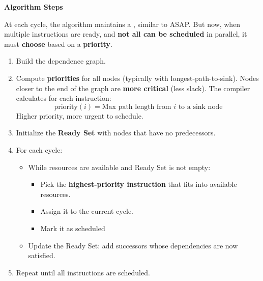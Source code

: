 \highspace
\begin{flushleft}
    \textcolor{Green3}{ \textbf{Algorithm Steps}}
\end{flushleft}
At each cycle, the algorithm maintains a , similar to ASAP. But now, when multiple instructions are ready, and \textbf{not all can be scheduled} in parallel, it must \textbf{choose} based on a \textbf{priority}.
\begin{enumerate}
    \item Build the dependence graph.
    \item Compute \textbf{priorities} for all nodes (typically with longest-path-to-sink). Nodes closer to the end of the graph are \textbf{more critical} (less slack). The compiler calculates for each instruction:
    \begin{equation*}
        \text{priority}\left(i\right) = \text{Max path length from } i \text{ to a sink node}
    \end{equation*}
    Higher priority, more urgent to schedule.
    \item Initialize the \textbf{Ready Set} with nodes that have no predecessors.
    \item For each cycle:
    \begin{itemize}
        \item While resources are available and Ready Set is not empty:
        \begin{itemize}
            \item Pick the \textbf{highest-priority instruction} that fits into available resources.
            \item Assign it to the current cycle.
            \item Mark it as scheduled
        \end{itemize}
        \item Update the Ready Set: add successors whose dependencies are now satisfied.
    \end{itemize}
    \item Repeat until all instructions are scheduled.
\end{enumerate}

\newpage

